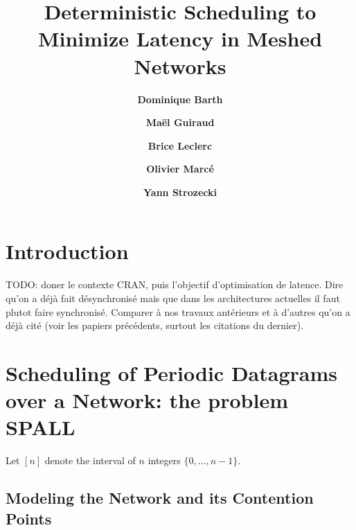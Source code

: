 \documentclass[english]{article}
\begin{document}
\title{ Deterministic Scheduling to Minimize Latency in Meshed Networks}
 

\newcommand{\todo}[1]{{\color{red} TODO: {#1}}}
\newcommand{\spall}{\textsc{SPALL}\xspace}
\newcommand{\bra}{\textsc{BRA}\xspace}
\newcommand{\ADO}{\textsc{ADO}\xspace}
\newcommand\greedydeadline{\texttt{Greedy Deadline}\xspace}
\newcommand\greedynormalized{\texttt{Greedy Normalized}\xspace}
\newcommand\greedypacked{\texttt{Greedy Packed}\xspace}
\newcommand\hybridgreedydeadline{\texttt{Hybrid Greedy Deadline}\xspace}
\newcommand\hybridgreedynormalized{\texttt{Hybrid Greedy Normalized}\xspace}
\newtheorem{theorem}{Theorem}
\newtheorem{lemma}[theorem]{Lemma}
\newtheorem{proposition}[theorem]{Proposition}
\newtheorem{corollary}[theorem]{Corollary}
\newtheorem{definition}{Definition}

\author[1]{\bf{ {Dominique Barth}}}
\author[1,2]{\bf{ {Ma\"el Guiraud}}}
\author[2]{\bf{ {Brice Leclerc}}}
\author[2]{\bf{ {Olivier Marc\'e}}}
\author[1]{\bf{ {Yann Strozecki}}}




\maketitle

\section{Introduction}

TODO: doner le contexte CRAN, puis l'objectif d'optimisation de latence. 
Dire qu'on a déjà fait désynchronisé mais que dans les architectures actuelles il faut plutot faire synchronisé.
Comparer à nos travaux antérieurs et à d'autres qu'on a déjà cité (voir les papiers précédents, surtout les citations du dernier).




\section{Scheduling of Periodic Datagrams over a Network: the problem \spall}


Let $[n]$ denote the interval of $n$ integers $\{0,\dots,n-1\}$.

  \subsection{Modeling the Network and its Contention Points}
\end{document}
